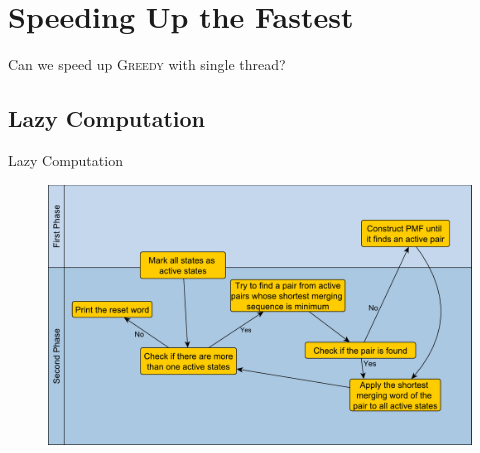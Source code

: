 \documentclass{beamer}
\begin{document}
\section{Speeding Up the Fastest}
\begin{frame}{Can we speed up \textsc{Greedy} with single thread?}
\begin{table}[ht]
	\center
	\caption{The length of longest merging sequence in PMF($h_{PMF}$) constructed in the first phase for random automata; maximum ($h_{max}$), and average ($h_{mean}$) lengths for merging sequences, used in the second phase of \textsc{Greedy}.}
\end{table}
\end{frame}

\subsection{Lazy Computation}
\begin{frame}{Lazy Computation}
	\begin{figure}
		\includegraphics[width=\textwidth]{figs/lazy_flow.pdf}
	\end{figure}
\end{frame}
\end{document}
